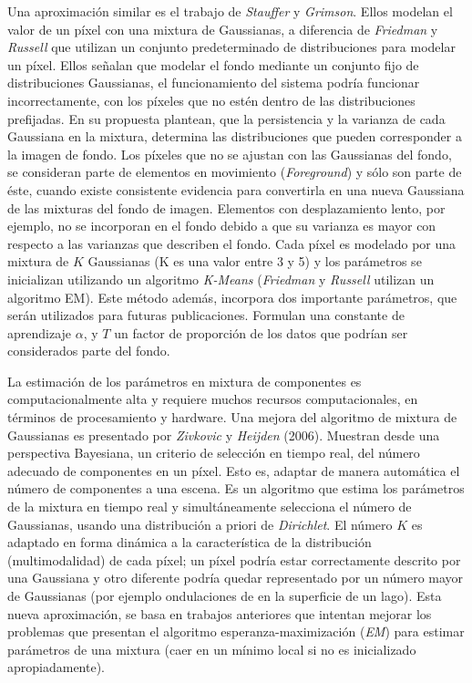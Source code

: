 Una aproximación similar es el trabajo de \textit{Stauffer} y \textit{Grimson}\cite{stauffer_adaptive_1999}. Ellos modelan el valor de un píxel con una mixtura de Gaussianas, a diferencia de \textit{Friedman} y \textit{Russell}\cite{friedman_image_1997} que utilizan un conjunto predeterminado de distribuciones para modelar un píxel. Ellos señalan que modelar el fondo mediante un conjunto fijo de distribuciones Gaussianas, el funcionamiento del sistema podría funcionar incorrectamente, con los píxeles que no estén  dentro de las distribuciones prefijadas. En su propuesta plantean, que la persistencia y la varianza de cada Gaussiana en la mixtura, determina las distribuciones que pueden corresponder a la imagen de fondo. Los píxeles que no se ajustan con las Gaussianas del fondo, se consideran parte de elementos en movimiento (\textit{Foreground}) y sólo son parte de éste, cuando existe consistente evidencia para convertirla en una nueva Gaussiana de las mixturas del fondo de imagen. Elementos con desplazamiento lento, por ejemplo, no se incorporan en el fondo debido a que su varianza es mayor con respecto a las varianzas que describen el fondo. Cada píxel es modelado por una mixtura de $K$ Gaussianas (K es una valor entre 3 y 5) y los parámetros se inicializan utilizando un algoritmo \textit{K-Means} (\textit{Friedman} y \textit{Russell}\cite{friedman_image_1997} utilizan un algoritmo EM\cite{dempster_maximum_1977}). Este método además, incorpora dos importante parámetros, que serán utilizados para futuras publicaciones. Formulan una constante de aprendizaje $\alpha$, y $T$ un factor de proporción de los datos que podrían ser considerados parte del fondo. 

\indent La estimación de los parámetros en mixtura de componentes es computacionalmente alta y requiere muchos recursos computacionales, en términos de procesamiento y hardware. Una mejora del algoritmo de mixtura de Gaussianas es presentado por \textit{Zivkovic} y \textit{Heijden} \cite{zivkovic_efficient_2006} (2006). Muestran desde una perspectiva Bayesiana, un criterio de selección en tiempo real, del número adecuado de componentes en un píxel. Esto es, adaptar de manera automática el número de componentes a una escena. Es un algoritmo que estima los parámetros de la mixtura en tiempo real y simultáneamente selecciona el número de Gaussianas, usando una distribución a priori de \textit{Dirichlet}. El número $K$ es adaptado en forma dinámica a la característica de la distribución (multimodalidad) de cada píxel;  un píxel podría estar correctamente descrito por una Gaussiana y otro diferente podría quedar representado por un número mayor de Gaussianas (por ejemplo ondulaciones de en la superficie de un lago). Esta nueva aproximación, se basa en trabajos anteriores \cite{zivkovic_recursive_2004, figueiredo_unsupervised_2002, brand_structure_199} que intentan mejorar los problemas que presentan el algoritmo esperanza-maximización (\textit{EM}) para estimar parámetros de una mixtura (caer en un mínimo local si no es inicializado apropiadamente).  

